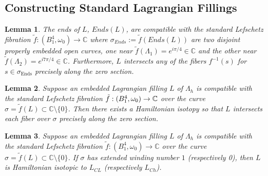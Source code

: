 \documentclass[10pt,a4paper]{amsart}
\newtheorem{lemma}{Lemma}
\newcommand{\C}{\mathbb{C}}
\newcommand{\sm}{\setminus}
\newcommand{\sse}{\subset}
\begin{document}
\subsection{Constructing Standard Lagrangian Fillings}\label{sec:std_fillings}

\begin{lemma}\label{lem:compends} The ends of $L$, $Ends(L)$, are compatible with the standard Lefschetz fibration $\tilde{f}:(B_1^4,\omega_0)\to \C$ where $\sigma_{Ends}:=\tilde{f}(Ends (L))$ are two disjoint properly embedded open curves, one near $\tilde{f}(\Lambda_1)=e^{i\pi/4}\in \C$ and the other near $\tilde{f}(\Lambda_2)=e^{i7\pi/4}\in \C$. Furthermore, $L$ intersects any of the fibers $f^{-1}(s)$ for $s\in \sigma_{\text{Ends}}$ precisely along the zero section.
\end{lemma}

\begin{lemma}\label{lem:hamisotozerosection} Suppose an embedded Lagrangian filling $L$ of $\Lambda_h$ is compatible with the standard Lefschetz fibration $\Tilde{f}:(B_1^4,\omega_0)\to \C$ over the curve $\sigma=\tilde{f}(L)\sse \C\sm \{0\}$. Then there exists a Hamiltonian isotopy so that $L$ intersects each fiber over $\sigma$ precisely along the zero section.
\end{lemma}

\begin{lemma}\label{lem:horiziso}
Suppose an embedded Lagrangian filling $L$ of $\Lambda_h$ is compatible with the standard Lefschetz fibration $\tilde{f}:(B^4_1,\omega_0)\to \C$ over the curve $\sigma=\tilde{f}(L)\sse \C\sm \{0\}$. If $\sigma$ has extended winding number $1$ (respectively 0), then $L$ is Hamiltonian isotopic to $L_{CL}$ (respectively $L_{Ch}$).
\end{lemma}
\end{document}

